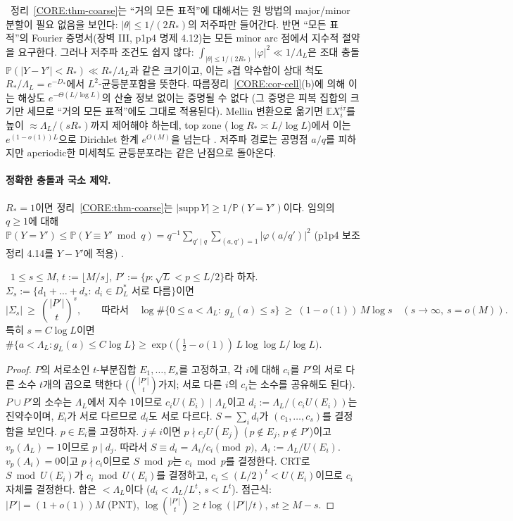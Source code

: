\begin{remark}[이분법: 모든 표적 대 거의 모든 표적]\label{CORE:rem-dichotomy}
\PROVED\ 정리~\ref{CORE:thm-coarse}는 ``거의 모든 표적''에 대해서는 원 방법의 major/minor 분할이 필요 없음을 보인다: $|\theta|\le1/(2R_*)$의 저주파만 들어간다. 반면 ``모든 표적''의 Fourier 증명서(장벽 III, p1p4 명제 4.12)는 모든 minor arc 점에서 지수적 절약을 요구한다. 그러나 저주파 조건도 쉽지 않다: $\int_{|\theta|\le1/(2R_*)}|\varphi|^2\ll1/\Lambda_L$은 조대 충돌 $\mathbb P(|Y-Y'|<R_*)\ll R_*/\Lambda_L$과 같은 크기이고, 이는 $s$겹 약수합이 상대 척도 $R_*/\Lambda_L=e^{-D_*}$에서 $L^2$-균등분포함을 뜻한다. 따름정리~\ref{CORE:cor-cell}(b)에 의해 이는 해상도 $e^{-\Theta(L/\log L)}$의 산술 정보 없이는 증명될 수 없다 (그 증명은 피복 집합의 크기만 세므로 ``거의 모든 표적''에도 그대로 적용된다). Mellin 변환으로 옮기면 $\mathbb E X_i^{i\tau}$를 높이 $\approx\Lambda_L/(sR_*)$까지 제어해야 하는데, top zone ($\log R_*\asymp L/\log L$)에서 이는 $e^{(1-o(1))L}$으로 Dirichlet 한계 $e^{O(M)}$을 넘는다 \HEUR. 저주파 경로는 공명점 $a/q$를 피하지만 aperiodic한 미세척도 균등분포라는 같은 난점으로 돌아온다.
\end{remark}

\paragraph{정확한 충돌과 국소 제약.} $R_*=1$이면 정리~\ref{CORE:thm-coarse}는 $|\mathrm{supp}\,Y|\ge1/\mathbb P(Y=Y')$이다. 임의의 $q\ge1$에 대해 $\mathbb P(Y=Y')\le\mathbb P(Y\equiv Y'\bmod q)=q^{-1}\sum_{q'\mid q}\sum_{(a,q')=1}|\varphi(a/q')|^2$ (p1p4 보조정리 4.14를 $Y-Y'$에 적용) \PROVED.

\begin{theorem}\label{CORE:thm-padic}
\PROVED\ $1\le s\le M$, $t:=\lfloor M/s\rfloor$, $P':=\{p:\sqrt L<p\le L/2\}$라 하자. $\Sigma_s:=\{d_1+\dots+d_s:\ d_i\in D^*_L\text{ 서로 다름}\}$이면
\[
|\Sigma_s|\ \ge\ \binom{|P'|}{t}^{s},\qquad\text{따라서}\quad \log\#\{0\le a<\Lambda_L:\ g_L(a)\le s\}\ \ge\ (1-o(1))\,M\log s\quad(s\to\infty,\ s=o(M)).
\]
특히 $s=C\log L$이면 $\#\{a<\Lambda_L: g_L(a)\le C\log L\}\ge\exp\bigl((\tfrac12-o(1))\,L\log\log L/\log L\bigr)$.
\end{theorem}
\begin{proof}
$P$의 서로소인 $t$-부분집합 $E_1,\dots,E_s$를 고정하고, 각 $i$에 대해 $c_i$를 $P'$의 서로 다른 소수 $t$개의 곱으로 택한다 ($\binom{|P'|}{t}$가지; 서로 다른 $i$의 $c_i$는 소수를 공유해도 된다). $P\cup P'$의 소수는 $\Lambda_L$에서 지수 $1$이므로 $c_iU(E_i)\mid\Lambda_L$이고 $d_i:=\Lambda_L/(c_iU(E_i))$는 진약수이며, $E_i$가 서로 다르므로 $d_i$도 서로 다르다. $S=\sum_id_i$가 $(c_1,\dots,c_s)$를 결정함을 보인다. $p\in E_i$를 고정하자. $j\ne i$이면 $p\nmid c_jU(E_j)$ (\,$p\notin E_j$, $p\notin P'$)이고 $v_p(\Lambda_L)=1$이므로 $p\mid d_j$. 따라서 $S\equiv d_i=A_i/c_i\pmod p$, $A_i:=\Lambda_L/U(E_i)$. $v_p(A_i)=0$이고 $p\nmid c_i$이므로 $S\bmod p$는 $c_i\bmod p$를 결정한다. CRT로 $S\bmod U(E_i)$가 $c_i\bmod U(E_i)$를 결정하고, $c_i\le(L/2)^t<U(E_i)$이므로 $c_i$ 자체를 결정한다. 합은 $<\Lambda_L$이다 ($d_i<\Lambda_L/L^{t}$, $s<L^t$). 점근식: $|P'|=(1+o(1))M$ (PNT), $\log\binom{|P'|}{t}\ge t\log(|P'|/t)$, $st\ge M-s$.
\end{proof}

